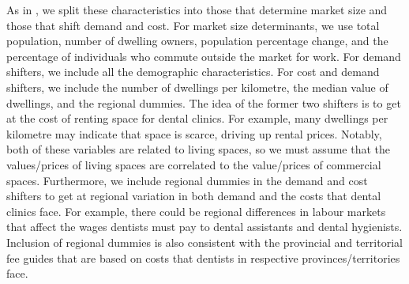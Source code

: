 \documentclass[a4paper,11pt]{article}
\begin{document}
As in \citet{BresReiss}, we split these characteristics into those that determine market size and those that shift demand and cost. For market size determinants, we use total population, number of dwelling owners, population percentage change, and the percentage of individuals who commute outside the market for work. For demand shifters, we include all the demographic characteristics. For cost and demand shifters, we include the number of dwellings per kilometre, the median value of dwellings, and the regional dummies. The idea of the former two shifters is to get at the cost of renting space for dental clinics. For example, many dwellings per kilometre may indicate that space is scarce, driving up rental prices. Notably, both of these variables are related to living spaces, so we must assume that the values/prices of living spaces are correlated to the value/prices of commercial spaces. Furthermore, we include regional dummies in the demand and cost shifters to get at regional variation in both demand and the costs that dental clinics face. For example, there could be regional differences in labour markets that affect the wages dentists must pay to dental assistants and dental hygienists. Inclusion of regional dummies is also consistent with the provincial and territorial fee guides that are based on costs that dentists in respective provinces/territories face.
\end{document}
